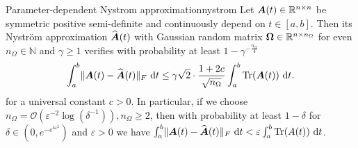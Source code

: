 \documentclass[12pt]{article}
\begin{document}
\begin{lemma}{Parameter-dependent Nystrom approximation}{nystrom}
    Let $\boldsymbol{A}(t) \in \mathbb{R}^{n \times n}$ be symmetric positive semi-definite and continuously depend on $t \in [a, b]$. Then its Nyström approximation $\widehat{\boldsymbol{A}}(t)$ with Gaussian random matrix $\boldsymbol{\Omega} \in \mathbb{R}^{n \times n_{\Omega}}$ for even $n_{\Omega} \in \mathbb{N}$ and $\gamma \geq 1$ verifies with probability at least $1 - \gamma^{-\frac{n_{\Omega}}{4}}$
    \begin{equation}
        \int_{a}^{b} \lVert \boldsymbol{A}(t) - \widehat{\boldsymbol{A}}(t) \rVert _F~\mathrm{d}t \leq \gamma \sqrt{2} \cdot \frac{1 + 2c}{\sqrt{n_{\Omega}}} \int_{a}^{b} \operatorname{Tr}(\boldsymbol{A}(t))~\mathrm{d}t.
    \end{equation}
    for a universal constant $c > 0$. In particular, if we choose $n_{\Omega} = \mathcal{O}(\varepsilon^{-2} \log(\delta^{-1})), n_{\Omega} \geq 2$, then with probability at least $1-\delta$ for $\delta \in (0, e^{-e^{4 \varepsilon^2}})$ and $\varepsilon > 0$ we have $\int_{a}^{b} \lVert \boldsymbol{A}(t) - \widehat{\boldsymbol{A}}(t) \rVert _F~\mathrm{d}t  < \varepsilon \int_{a}^{b} \operatorname{Tr}(A(t))~\mathrm{d}t$.
\end{lemma}

\end{document}
